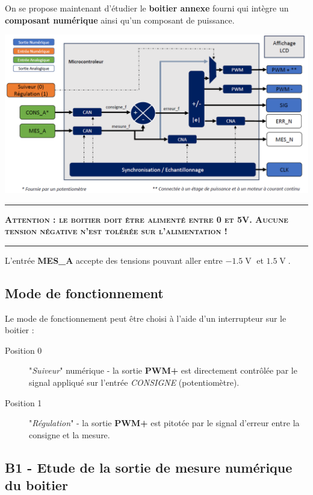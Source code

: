 \documentclass[a4paper,11pt]{article}
\begin{document}
On se propose maintenant d'étudier le \textbf{boitier annexe} fourni qui intègre un \textbf{composant numérique} ainsi qu'un composant de puissance.

\begin{center}
	\includegraphics[width=\textwidth]{images/maquette_regul.png}
\end{center}

\noindent \rule{\linewidth}{1pt}

\textbf{\large \textsc{Attention : le boitier doit être alimenté entre 0 et 5V. Aucune tension négative n'est tolérée sur l'alimentation !}}

\noindent \rule{\linewidth}{1pt}

L'entrée \textbf{\textsc{MES\_A}} accepte des tensions pouvant aller entre $-1.5\operatorname{V}$ et $1.5\operatorname{V}$.

\subsection*{Mode de fonctionnement}

Le mode de fonctionnement peut être choisi à l'aide d'un interrupteur sur le boitier :

\begin{description}
	\item[Position 0] "\textit{Suiveur}" numérique - la sortie \textbf{\textsc{PWM+}} est directement contrôlée par le signal appliqué sur l'entrée \textit{CONSIGNE} (potentiomètre).
	\item[Position 1] "\textit{Régulation}" - la sortie \textbf{\textsc{PWM+}} est pitotée par le signal d'erreur entre la consigne et la mesure.
\end{description}


\subsection*{B1 - Etude de la sortie de mesure numérique du boitier}
\end{document}
